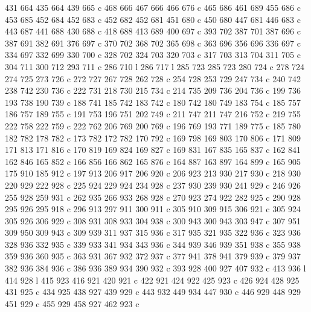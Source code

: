 {{        431 664 435 664 439 665 c
        468 666 467 666 466 676 c
        465 686 461 689 455 686 c
        453 685 452 684 452 683 c
        452 682 452 681 451 680 c
        450 680 447 681 446 683 c
        443 687 441 688 430 688 c
        418 688 413 689 400 697 c
        393 702 387 701 387 696 c
        387 691 382 691 376 697 c
        370 702 368 702 365 698 c
        363 696 356 696 336 697 c
        334 697 332 699 330 700 c
        328 702 324 703 320 703 c
        317 703 313 704 311 705 c
        304 711 300 712 293 711 c
        286 710 l
        286 717 l
        285 723 285 723 280 724 c
        278 724 274 725 273 726 c
        272 727 267 728 262 728 c
        254 728 253 729 247 734 c
        240 742 238 742 230 736 c
        222 731 218 730 215 734 c
        214 735 209 736 204 736 c
        199 736 193 738 190 739 c
        188 741 185 742 183 742 c
        180 742 180 749 183 754 c
        185 757 186 757 189 755 c
        191 753 196 751 202 749 c
        211 747 211 747 216 752 c
        219 755 222 758 222 759 c
        222 762 206 769 200 769 c
        196 769 193 771 189 775 c
        185 780 182 782 178 782 c
        173 782 172 782 170 792 c
        169 798 169 803 170 806 c
        171 809 171 813 171 816 c
        170 819 169 824 169 827 c
        169 831 167 835 165 837 c
        162 841 162 846 165 852 c
        166 856 166 862 165 876 c
        164 887 163 897 164 899 c
        165 905 175 910 185 912 c
        197 913 206 917 206 920 c
        206 923 213 930 217 930 c
        218 930 220 929 222 928 c
        225 924 229 924 234 928 c
        237 930 239 930 241 929 c
        246 926 255 928 259 931 c
        262 935 266 933 268 928 c
        270 923 274 922 282 925 c
        290 928 295 926 295 918 c
        296 913 297 911 300 911 c
        305 910 309 915 306 921 c
        305 924 305 926 306 929 c
        308 931 308 933 304 938 c
        300 943 300 943 303 947 c
        307 951 309 950 309 943 c
        309 939 311 937 315 936 c
        317 935 321 935 322 936 c
        323 936 328 936 332 935 c
        339 933 341 934 343 936 c
        344 939 346 939 351 938 c
        355 938 359 936 360 935 c
        363 931 367 932 372 937 c
        377 941 378 941 379 939 c
        379 937 382 936 384 936 c
        386 936 389 934 390 932 c
        393 928 400 927 407 932 c
        413 936 l
        414 928 l
        415 923 416 921 420 921 c
        422 921 424 922 425 923 c
        426 924 428 925 431 925 c
        434 925 438 927 439 929 c
        443 932 449 934 447 930 c
        446 929 448 929 451 929 c
        455 929 458 927 462 923 c
}}
